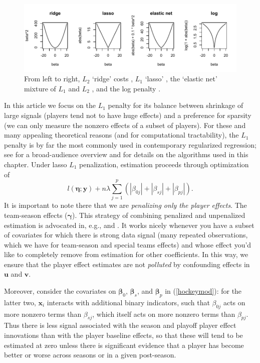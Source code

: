 \begin{figure}[t]
\includegraphics[width=\textwidth]{figures/penalties}
\caption{\label{costs} 
From left to right, 
$L_2$ `ridge' costs \cite{hoerl_ridge_1970}, $L_1$ `lasso' \cite{tibshirani_regression_1996}, the `elastic net' mixture of $L_1$ and $L_2$ \cite{zou_regularization_2005}, and the log penalty \cite{candes_enhancing_2008}.
}
\end{figure}

In this article we focus on the $L_1$ penalty for its balance between
shrinkage of large signals (players tend not to have huge effects) and a
preference for sparsity (we can only measure the nonzero effects of a subset
of players).  For these and many appealing theoretical reasons (and for
computational tractability), the $L_1$ penalty is by far the most commonly
used in contemporary regularized regression; see
\cite{hastie:tibsh:fried:2001} for a broad-audience overview and
\cite{taddy_one-step_2015} for details on the algorithms used in this chapter.
Under lasso $L_1$ penalization, estimation proceeds through optimization of
\begin{equation} \label{pendev}
l\left(\boldsymbol{\eta}; \mathbf{y}\right) + n\lambda \sum_{j=1}^p\left(|\beta_{0j}| + |\beta_{sj}| + |\beta_{pj}|\right).
\end{equation}
It is important to note there that we are \textit{penalizing only the player
effects}.  The team-season effects ($\boldsymbol{\gamma}$).  This strategy of
combining penalized and unpenalized estimation is advocated in, e.g.,
\cite{taddy_distributed_2015} and \cite{gentzkow_measuring_2015}.  It works
nicely whenever you have a subset of covariates for which there is strong data
signal (many repeated observations, which we have for team-season and special
teams effects) and whose effect you'd like to completely remove from
estimation for other coefficients.  In this way, we ensure that the player
effect estimates are not \textit{polluted} by confounding effects in
$\mathbf{u}$ and $\mathbf{v}$.  

Moreover, consider the covariates on $\boldsymbol{\beta}_0$,
$\boldsymbol{\beta}_s$, and $\boldsymbol{\beta}_p$ in (\ref{hockeymod}): for the latter two,
 $\mathbf{x}_i$ interacts with additional binary indicators, such that
$\beta_{0j}$ acts on more nonzero terms than $\beta_{sj}$, which itself acts
on more nonzero terms than $\beta_{pj}$.  Thus there is  less signal
associated with the season and playoff player effect innovations than with the
player baseline effects, so that these will tend to be estimated at zero unless
there is significant evidence that a player has become better or worse across
seasons or in a given post-season.


